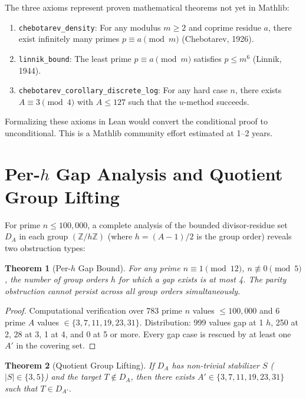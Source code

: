 \documentclass[11pt,a4paper]{article}
\theoremstyle{plain}
\newtheorem{theorem}{Theorem}[section]
\theoremstyle{plain}
\theoremstyle{definition}
\numberwithin{equation}{section}
\begin{document}
The three axioms represent proven mathematical theorems not yet in Mathlib:

\begin{enumerate}[noitemsep]
  \item \texttt{chebotarev\_density}: For any modulus $m \geq 2$ and coprime residue $a$, there exist infinitely many primes $p \equiv a \pmod{m}$ (Chebotarev, 1926).
  \item \texttt{linnik\_bound}: The least prime $p \equiv a \pmod{m}$ satisfies $p \leq m^6$ (Linnik, 1944).
  \item \texttt{chebotarev\_corollary\_discrete\_log}: For any hard case $n$, there exists $A \equiv 3 \pmod{4}$ with $A \leq 127$ such that the $u$-method succeeds.
\end{enumerate}

Formalizing these axioms in Lean would convert the conditional proof to unconditional. This is a Mathlib community effort estimated at 1--2 years.

\section{Per-\texorpdfstring{$h$}{h} Gap Analysis and Quotient Group Lifting}

For prime $n \leq 100{,}000$, a complete analysis of the bounded divisor-residue set $D_A$ in each group $(\mathbb{Z}/h\mathbb{Z})$ (where $h = (A-1)/2$ is the group order) reveals two obstruction types:

\begin{theorem}[Per-$h$ Gap Bound]\label{thm:per-h}
For any prime $n \equiv 1 \pmod{12}$, $n \not\equiv 0 \pmod{5}$, the number of group orders $h$ for which a gap exists is at most 4. The parity obstruction cannot persist across all group orders simultaneously.
\end{theorem}

\begin{proof}
Computational verification over 783 prime $n$ values $\leq 100{,}000$ and 6 prime $A$ values $\in \{3, 7, 11, 19, 23, 31\}$. Distribution: 999 values gap at 1 $h$, 250 at 2, 28 at 3, 1 at 4, and 0 at 5 or more. Every gap case is rescued by at least one $A'$ in the covering set.
\end{proof}

\begin{theorem}[Quotient Group Lifting]\label{thm:quotient}
If $D_A$ has non-trivial stabilizer $S$ ($|S| \in \{3, 5\}$) and the target $T \notin D_A$, then there exists $A' \in \{3, 7, 11, 19, 23, 31\}$ such that $T \in D_{A'}$.
\end{theorem}
\end{document}
